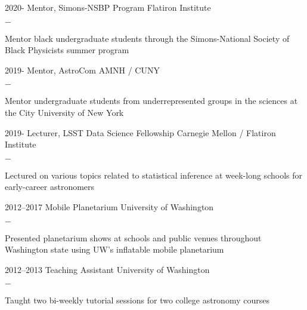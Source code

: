 \documentclass[]{luger-cv} %
\begin{document}
\begin{entrylist}


    \entry
    {2020-}
    {Mentor, Simons-NSBP Program}
    {Flatiron Institute}
    {%
        \vspace{-1em}
        \begin{list}{{\color{numcolor}$-$}}{\cvlist}
            \item Mentor black undergraduate students through the Simons-National
                  Society of Black Physicists summer program
        \end{list}
    }


    \entry
    {2019-}
    {Mentor, AstroCom}
    {AMNH / CUNY}
    {%
        \vspace{-1em}
        \begin{list}{{\color{numcolor}$-$}}{\cvlist}
            \item Mentor undergraduate students from underrepresented groups in the sciences
                  at the City University of New York
        \end{list}
    }


    \entry
    {2019-}
    {Lecturer, LSST Data Science Fellowship}
    {Carnegie Mellon / Flatiron Institute}
    {%
        \vspace{-1em}
        \begin{list}{{\color{numcolor}$-$}}{\cvlist}
            \item Lectured on various topics related to statistical
                    inference at week-long schools for early-career astronomers
        \end{list}
    }


    \entry
    {2012--2017}
    {Mobile Planetarium}
    {University of Washington}
    {%
        \vspace{-1em}
        \begin{list}{{\color{numcolor}$-$}}{\cvlist}
            \item Presented planetarium shows at schools and public venues throughout
                    Washington state using UW's inflatable mobile planetarium
        \end{list}
    }


    \entry
    {2012--2013}
    {Teaching Assistant}
    {University of Washington}
    {%
        \vspace{-1em}
        \begin{list}{{\color{numcolor}$-$}}{\cvlist}
            \item Taught two bi-weekly tutorial sessions for two college astronomy courses
        \end{list}
    }


\end{entrylist}
\end{document}

